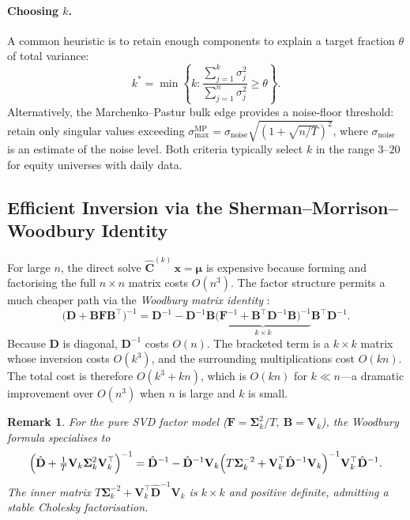 \documentclass[11pt,a4paper]{article}
\newcommand{\C}{\mathbf{C}}
\newcommand{\x}{\mathbf{x}}
\newcommand{\muvec}{\bm{\mu}}
\newcommand{\Bload}{\mathbf{B}}
\newcommand{\Ffac}{\mathbf{F}}
\newcommand{\Dspe}{\mathbf{D}}
\newtheorem{remark}{Remark}
\begin{document}
\paragraph{Choosing $k$.}
A common heuristic is to retain enough components to explain a target fraction
$\theta$ of total variance:
\begin{equation}
  k^* = \min\!\left\{k : \frac{\sum_{j=1}^{k}\sigma_j^2}
                              {\sum_{j=1}^{n}\sigma_j^2} \geq \theta\right\}.
\end{equation}
Alternatively, the Marchenko--Pastur bulk edge \citep{marchenko1967} provides a
noise-floor threshold: retain only singular values exceeding
$\sigma_{\max}^{\mathrm{MP}} = \sigma_{\mathrm{noise}}\sqrt{(1 + \sqrt{n/T})^2}$,
where $\sigma_{\mathrm{noise}}$ is an estimate of the noise level.  Both
criteria typically select $k$ in the range $3$--$20$ for equity universes with
daily data.

\subsection{Efficient Inversion via the Sherman--Morrison--Woodbury Identity}
\label{sec:woodbury}

For large $n$, the direct solve $\hat{\C}^{(k)}\,\x = \muvec$ is expensive
because forming and factorising the full $n \times n$ matrix costs $O(n^3)$.
The factor structure permits a much cheaper path via the \emph{Woodbury matrix
identity} \citep{woodbury1950}:
\begin{equation}
  \label{eq:woodbury}
  \bigl(\Dspe + \Bload\Ffac\Bload^\top\bigr)^{-1}
  = \Dspe^{-1}
    - \Dspe^{-1}\Bload
      \underbrace{\bigl(\Ffac^{-1} + \Bload^\top\Dspe^{-1}\Bload\bigr)^{-1}}_{k \times k}
      \Bload^\top\Dspe^{-1}.
\end{equation}
Because $\Dspe$ is diagonal, $\Dspe^{-1}$ costs $O(n)$.  The bracketed
term is a $k \times k$ matrix whose inversion costs $O(k^3)$, and the
surrounding multiplications cost $O(kn)$.  The total cost is therefore
$O(k^3 + kn)$, which is $O(kn)$ for $k \ll n$---a dramatic improvement
over $O(n^3)$ when $n$ is large and $k$ is small.

\begin{remark}
  For the pure SVD factor model ($\Ffac = \bm{\Sigma}_k^2/T$,
  $\Bload = \mathbf{V}_k$), the Woodbury formula specialises to
  \begin{equation}
    \Bigl(\hat{\Dspe}
           + \tfrac{1}{T}\mathbf{V}_k\bm{\Sigma}_k^2\mathbf{V}_k^\top\Bigr)^{-1}
    = \hat{\Dspe}^{-1}
      - \hat{\Dspe}^{-1}\mathbf{V}_k
        \Bigl(T\bm{\Sigma}_k^{-2}
               + \mathbf{V}_k^\top\hat{\Dspe}^{-1}\mathbf{V}_k\Bigr)^{-1}
        \mathbf{V}_k^\top\hat{\Dspe}^{-1}.
  \end{equation}
  The inner matrix $T\bm{\Sigma}_k^{-2} + \mathbf{V}_k^\top\hat{\Dspe}^{-1}\mathbf{V}_k$
  is $k \times k$ and positive definite, admitting a stable Cholesky
  factorisation.
\end{remark}
\end{document}

